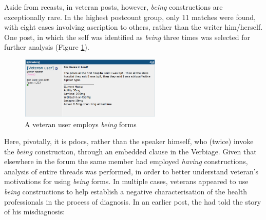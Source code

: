 Aside from recasts, in veteran \glspl{post}, however, \emph{being} constructions are exceptionally rare. In the highest postcount group, only 11 matches were found, with eight cases involving ascription to others, rather than the writer him\slash herself. One post, in which the self was identified as \emph{being}  three times was selected for further analysis (Figure \ref{fig:firstsaid}).
    

\begin{figure}[H]
  \begin{center}
  \includegraphics[width=0.6\textwidth]{../images/firstsaid.png}
  \end{center}
  \caption{A veteran user employs \emph{being} forms}
  \label{fig:firstsaid}
  \end{figure}
%
\noindent Here, pivotally, it is pdocs, rather than the speaker himself, who (twice) invoke the \emph{being} construction, through an embedded clause in the Verbiage. Given that elsewhere in the forum the same member had employed \emph{having} constructions, analysis of entire threads was performed, in order to better understand veteran's motivations for using \emph{being} forms. In multiple cases, veterans appeared to use \emph{being} constructions to help establish a negative characterisation of the health professionals in the process of diagnosis. In an earlier \gls{post}, the  had told the story of his misdiagnosis:
    
    
